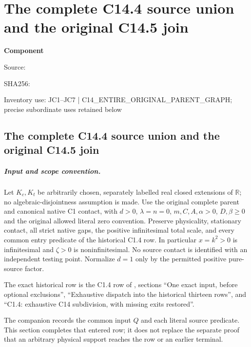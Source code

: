 \chapter{The complete C14.4 source union and the original C14.5 join}
\label{component:pfd0dd7bb10cf}
\noindent\textbf{Component }\par
{\small\noindent Source: \par}
{\small\noindent SHA256: \par}
{\small\noindent Inventory use: JC1--JC7 | C14\_\allowbreak{}ENTIRE\_\allowbreak{}ORIGINAL\_\allowbreak{}PARENT\_\allowbreak{}GRAPH; precise subordinate uses retained below\par}
\medskip
\section{The complete C14.4 source union and the original C14.5 join}
\label{pfd0dd7bb10cf:sec:fresh-c144-c145-join}

\paragraph{Input and scope convention.}
Let $K_c,K_t$ be arbitrarily chosen, separately labelled real closed
extensions of $\mathbb R$; no algebraic-disjointness assumption is made.
Use the original complete parent and canonical native C1 contact,
with $d>0$, $\lambda=n=0$, $m,C,A,\alpha>0$, $D,\beta\ge0$
and the original allowed literal zero convention.  Preserve physicality,
stationary contact, all strict native gaps, the positive infinitesimal
total scale, and every common entry predicate of the historical C1.4
row.  In particular $x=k^2>0$ is infinitesimal and
$\zeta>0$ is noninfinitesimal.  No source contact is identified with
an independent testing point.  Normalize $d=1$ only by the permitted
positive pure-source factor.

The exact historical row is the C1.4 row of
, sections
``One exact input, before optional exclusions'', ``Exhaustive dispatch
into the historical thirteen rows'', and ``C1.4: exhaustive C14
subdivision, with missing exits restored''.

The companion
 records the common input $Q$ and each
literal source predicate.  This section completes that entered row;
it does not replace the separate proof that an arbitrary physical
support reaches the row or an earlier terminal.

